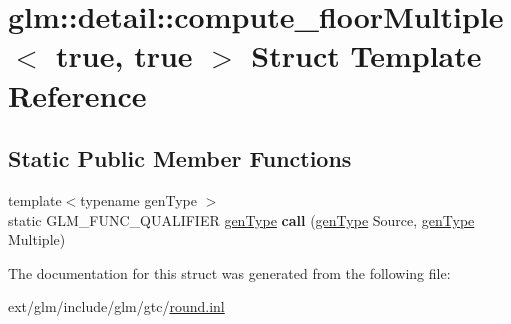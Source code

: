 \hypertarget{structglm_1_1detail_1_1compute__floor_multiple_3_01true_00_01true_01_4}{\section{glm\-:\-:detail\-:\-:compute\-\_\-floor\-Multiple$<$ true, true $>$ Struct Template Reference}
\label{structglm_1_1detail_1_1compute__floor_multiple_3_01true_00_01true_01_4}
}
\subsection*{Static Public Member Functions}
\begin{DoxyCompactItemize}
\item 
\hypertarget{structglm_1_1detail_1_1compute__floor_multiple_3_01true_00_01true_01_4_a18fef0ea82a4549501b832f4571ab1c5}{{\footnotesize template$<$typename gen\-Type $>$ }\\static G\-L\-M\-\_\-\-F\-U\-N\-C\-\_\-\-Q\-U\-A\-L\-I\-F\-I\-E\-R \hyperlink{structglm_1_1detail_1_1gen_type}{gen\-Type} {\bfseries call} (\hyperlink{structglm_1_1detail_1_1gen_type}{gen\-Type} Source, \hyperlink{structglm_1_1detail_1_1gen_type}{gen\-Type} Multiple)}\label{structglm_1_1detail_1_1compute__floor_multiple_3_01true_00_01true_01_4_a18fef0ea82a4549501b832f4571ab1c5}

\end{DoxyCompactItemize}


The documentation for this struct was generated from the following file\-:\begin{DoxyCompactItemize}
\item 
ext/glm/include/glm/gtc/\hyperlink{round_8inl}{round.\-inl}\end{DoxyCompactItemize}
